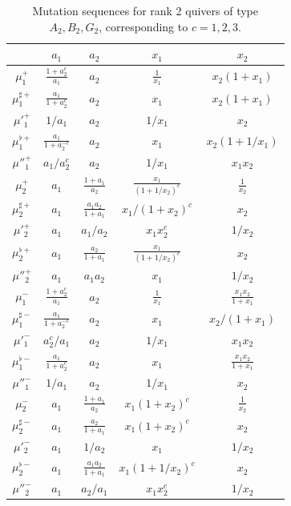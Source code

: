 \documentclass[12pt,reqno]{article}
\numberwithin{equation}{section}
\numberwithin{equation}{section}
\begin{document}
\begin{table}[htb]
\begin{center}
\begin{tabular}{|c||c|c||c|c||}
\hline
& $a_1$ & $a_2$ & $x_1$ & $x_2$ \\
\hline
$\mu_1^+$ & $\frac{1+a_2^c}{a_1}$ & $a_2$ & $\frac{1}{x_1}$ & $x_2(1+x_1)$ \\
$\mu_1^{\sharp+}$&$\frac{a_1}{1+a_2^{c}} $&$ a_2$&$x_1$&$ x_2(1+x_1) $\\
$\mu'^+_1$&$1/a_1$&$ a_2 $&$1/x_1$&$ x_2 $ \\
$\mu_1^{\flat+} $&$ \frac{a_1} {1+a_2^{-c}} $&$ a_2 $&$ x_1 $&$ x_2 (1+1/x_1)$ \\
$\mu''^+_1 $&$ a_1/a_2^c $&$ a_2 $&$ 1/x_1 $&$ x_1 x_2 $ \\
\hline
$\mu_2^+ $&$ a_1$&$ \frac{1+a_1}{a_2} $&$\frac{x_1}{(1+1/x_2)^c}$&$ \frac{1}{x_2}  $ \\
$\mu_2^{\sharp+}$&$a_1$&$ \frac{a_1 a_2}{1+a_1}$&$x_1/(1+x_2)^c$&$ x_2 $ \\
$\mu'^+_2$&$a_1$&$a_1/a_2$&$x_1 x_2^c $&$1/x_2 $ \\
$\mu_2^{\flat+} $&$ a_1 $&$ \frac{a_2}{1+a_1} $&$ \frac{x_1}{(1+1/x_2)^c}$&$ x_2$ \\
$\mu''^+_2 $&$ a_1 $&$ a_1 a_2 $&$ x_1 $&$ 1/x_2$ \\
\hline
$\mu_1^-$&$\frac{1+a_2^c}{a_1}$&$ a_2 $&$\frac{1}{x_1}$&$\frac{x_1 x_2}{1+x_1}$ \\
$\mu_1^{\sharp-}$&$\frac{a_1}{1+a_2^{-c}}$&$ a_2 $&$x_1$&$x_2/(1+x_1)$ \\
$\mu'^-_1$&$a_2^c/a_1$&$a_2$&$1/x_1$&$x_1 x_2 $ \\
$\mu_1^{\flat-} $&$ \frac{a_1}{1+a_2^{c}} $&$ a_2 $&$ x_1 $&$ \frac{x_1 x_2}{1+x_1}$ \\
$\mu''^-_1 $&$ 1/a_1 $&$ a_2 $&$ 1/x_1 $&$ x_2 $ \\
\hline
$\mu_2^- $&$a_1$&$\frac{1+a_1}{a_2} $&$x_1(1+x_2)^c$&$\frac{1}{x_2}   $ \\
$\mu_2^{\sharp-}$&$a_1$&$ \frac{a_2}{1+a_1}$&$x_1(1+x_2)^c$&$  x_2$ \\
$\mu'^-_2$&$a_1 $&$ 1/a_2$&$x_1$&$1/x_2$ \\
$\mu_2^{\flat-} $&$ a_1 $&$ \frac{a_1 a_2}{1+a_1} $&$ x_1(1+1/x_2)^c$&$  x_2$ \\
$\mu''^-_2 $&$ a_1 $&$ a_2/a_1 $&$ x_1 x_2^c $&$ 1/x_2$ \\
\hline
\end{tabular}
\end{center}
\caption{Mutation sequences for rank 2 quivers of type $A_2, B_2, G_2$, corresponding to $c=1,2,3$.}
\label{rank2table}
\end{table}
\end{document}
